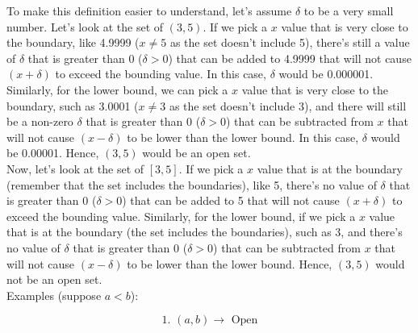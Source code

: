 \documentclass[11pt]{article}
\begin{document}
To make this definition easier to understand, let's assume \(\delta\) to be a very small number. Let's look at the set of \((3,5)\). If we pick a \(x\) value that is very close to the boundary, like 4.9999 (\(x \neq 5\) as the set doesn't include 5), there's still a value of \(\delta\) that is greater than 0 (\(\delta > 0\)) that can be added to 4.9999 that will not cause \((x + \delta)\) to exceed the bounding value. In this case, \(\delta\) would be 0.000001. Similarly, for the lower bound, we can pick a \(x\) value that is very close to the boundary, such as 3.0001 (\(x \neq 3\) as the set doesn't include 3), and there will still be a non-zero \(\delta\) that is greater than 0 (\(\delta > 0\)) that can be subtracted from \(x\) that will not cause \((x - \delta)\) to be lower than the lower bound. In this case, \(\delta\) would be 0.00001. Hence, \((3,5)\) would be an open set.
\\[0pt]

Now, let's look at the set of \([3,5]\). If we pick a \(x\) value that is at the boundary (remember that the set includes the boundaries), like 5, there's no value of \(\delta\) that is greater than 0 (\(\delta > 0\)) that can be added to 5 that will not cause \((x + \delta)\) to exceed the bounding value. Similarly, for the lower bound, if we pick a \(x\) value that is at the boundary (the set includes the boundaries), such as 3, and there's no value of \(\delta\) that is greater than 0 (\(\delta > 0\)) that can be subtracted from \(x\) that will not cause \((x - \delta)\) to be lower than the lower bound. Hence, \((3,5)\) would not be an open set.
\\[0pt]

Examples (suppose \(a < b\)):

\[\text{1. } (a, b) \rightarrow \text{ Open}\]

\begin{center}
\end{center}
\end{document}
